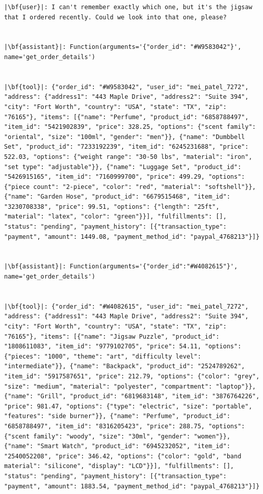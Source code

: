\begin{verbatim}
|\bf{user}|: I can't remember exactly which one, but it's the jigsaw that I ordered recently. Could we look into that one, please?


|\bf{assistant}|: Function(arguments='{"order_id": "#W9583042"}', name='get_order_details')


|\bf{tool}|: {"order_id": "#W9583042", "user_id": "mei_patel_7272", "address": {"address1": "443 Maple Drive", "address2": "Suite 394", "city": "Fort Worth", "country": "USA", "state": "TX", "zip": "76165"}, "items": [{"name": "Perfume", "product_id": "6858788497", "item_id": "5421902839", "price": 328.25, "options": {"scent family": "oriental", "size": "100ml", "gender": "men"}}, {"name": "Dumbbell Set", "product_id": "7233192239", "item_id": "6245231688", "price": 522.03, "options": {"weight range": "30-50 lbs", "material": "iron", "set type": "adjustable"}}, {"name": "Luggage Set", "product_id": "5426915165", "item_id": "7160999700", "price": 499.29, "options": {"piece count": "2-piece", "color": "red", "material": "softshell"}}, {"name": "Garden Hose", "product_id": "6679515468", "item_id": "3230708338", "price": 99.51, "options": {"length": "25ft", "material": "latex", "color": "green"}}], "fulfillments": [], "status": "pending", "payment_history": [{"transaction_type": "payment", "amount": 1449.08, "payment_method_id": "paypal_4768213"}]}


|\bf{assistant}|: Function(arguments='{"order_id":"#W4082615"}', name='get_order_details')


|\bf{tool}|: {"order_id": "#W4082615", "user_id": "mei_patel_7272", "address": {"address1": "443 Maple Drive", "address2": "Suite 394", "city": "Fort Worth", "country": "USA", "state": "TX", "zip": "76165"}, "items": [{"name": "Jigsaw Puzzle", "product_id": "1808611083", "item_id": "9779102705", "price": 54.11, "options": {"pieces": "1000", "theme": "art", "difficulty level": "intermediate"}}, {"name": "Backpack", "product_id": "2524789262", "item_id": "5917587651", "price": 212.79, "options": {"color": "grey", "size": "medium", "material": "polyester", "compartment": "laptop"}}, {"name": "Grill", "product_id": "6819683148", "item_id": "3876764226", "price": 981.47, "options": {"type": "electric", "size": "portable", "features": "side burner"}}, {"name": "Perfume", "product_id": "6858788497", "item_id": "8316205423", "price": 288.75, "options": {"scent family": "woody", "size": "30ml", "gender": "women"}}, {"name": "Smart Watch", "product_id": "6945232052", "item_id": "2540052208", "price": 346.42, "options": {"color": "gold", "band material": "silicone", "display": "LCD"}}], "fulfillments": [], "status": "pending", "payment_history": [{"transaction_type": "payment", "amount": 1883.54, "payment_method_id": "paypal_4768213"}]}



\end{verbatim}
